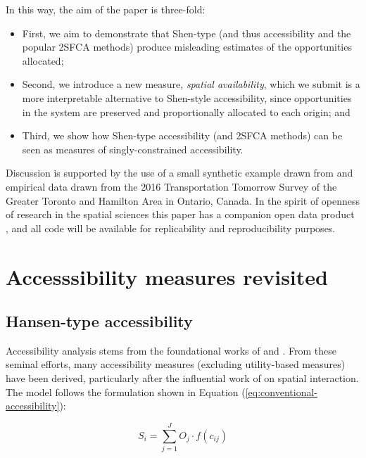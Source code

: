 \documentclass[]{elsarticle} %
\begin{document}
In this way, the aim of the paper is three-fold:

\begin{itemize}
\item
  First, we aim to demonstrate that Shen-type (and thus
  \citet{weibull_axiomatic_1976} accessibility and the popular 2SFCA
  methods) produce misleading estimates of the opportunities allocated;
\item
  Second, we introduce a new measure, \emph{spatial availability}, which
  we submit is a more interpretable alternative to Shen-style
  accessibility, since opportunities in the system are preserved and
  proportionally allocated to each origin; and
\item
  Third, we show how Shen-type accessibility (and 2SFCA methods) can be
  seen as measures of singly-constrained accessibility.
\end{itemize}

Discussion is supported by the use of a small synthetic example drawn
from \citet{shen1998} and empirical data drawn from the 2016
Transportation Tomorrow Survey of the Greater Toronto and Hamilton Area
in Ontario, Canada. In the spirit of openness of research in the spatial
sciences \citep{brunsdon2021opening, paez2021open} this paper has a
companion open data product \citep{arribas2021Open}, and all code will
be available for replicability and reproducibility purposes.

\hypertarget{background}{%
\section{Accesssibility measures revisited}\label{background}}

\hypertarget{hansen-type-accessibility}{%
\subsection{Hansen-type accessibility}\label{hansen-type-accessibility}}

Accessibility analysis stems from the foundational works of
\citet{harris_market_1954} and \citet{hansen1959}. From these seminal
efforts, many accessibility measures (excluding utility-based measures)
have been derived, particularly after the influential work of
\citet{wilson1971} on spatial interaction. The model follows the
formulation shown in Equation (\ref{eq:conventional-accessibility}):

\begin{equation}
\label{eq:conventional-accessibility}
S_i = \sum_{j=1}^JO_j \cdot f(c_{ij})
\end{equation}
\end{document}
